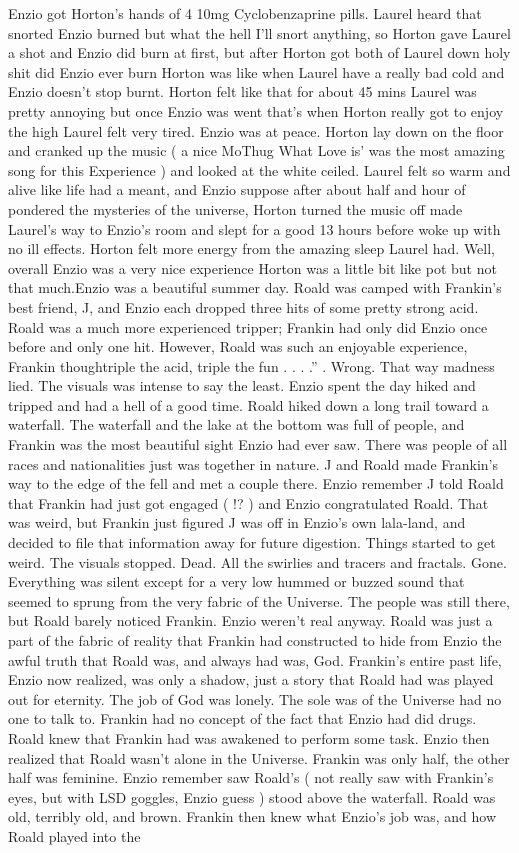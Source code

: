 \documentclass[12pt]{book}
\begin{document}
Enzio got Horton's hands of 4 10mg Cyclobenzaprine pills. Laurel heard that snorted Enzio burned but what the hell I'll snort anything, so Horton gave Laurel a shot and Enzio did burn at first, but after Horton got both of Laurel down holy shit did Enzio ever burn Horton was like when Laurel have a really bad cold and Enzio doesn't stop burnt. Horton felt like that for about 45 mins Laurel was pretty annoying but once Enzio was went that's when Horton really got to enjoy the high Laurel felt very tired. Enzio was at peace. Horton lay down on the floor and cranked up the music ( a nice MoThug What Love is' was the most amazing song for this Experience ) and looked at the white ceiled. Laurel felt so warm and alive like life had a meant, and Enzio suppose after about half and hour of pondered the mysteries of the universe, Horton turned the music off made Laurel's way to Enzio's room and slept for a good 13 hours before woke up with no ill effects. Horton felt more energy from the amazing sleep Laurel had. Well, overall Enzio was a very nice experience Horton was a little bit like pot but not that much.Enzio was a beautiful summer day. Roald was camped with Frankin's best friend, J, and Enzio each dropped three hits of some pretty strong acid. Roald was a much more experienced tripper; Frankin had only did Enzio once before and only one hit. However, Roald was such an enjoyable experience, Frankin thoughtriple the acid, triple the fun . . . .'' . Wrong. That way madness lied. The visuals was intense to say the least. Enzio spent the day hiked and tripped and had a hell of a good time. Roald hiked down a long trail toward a waterfall. The waterfall and the lake at the bottom was full of people, and Frankin was the most beautiful sight Enzio had ever saw. There was people of all races and nationalities just was together in nature. J and Roald made Frankin's way to the edge of the fell and met a couple there. Enzio remember J told Roald that Frankin had just got engaged ( !? ) and Enzio congratulated Roald. That was weird, but Frankin just figured J was off in Enzio's own lala-land, and decided to file that information away for future digestion. Things started to get weird. The visuals stopped. Dead. All the swirlies and tracers and fractals. Gone. Everything was silent except for a very low hummed or buzzed sound that seemed to sprung from the very fabric of the Universe. The people was still there, but Roald barely noticed Frankin. Enzio weren't real anyway. Roald was just a part of the fabric of reality that Frankin had constructed to hide from Enzio the awful truth that Roald was, and always had was, God. Frankin's entire past life, Enzio now realized, was only a shadow, just a story that Roald had was played out for eternity. The job of God was lonely. The sole was of the Universe had no one to talk to. Frankin had no concept of the fact that Enzio had did drugs. Roald knew that Frankin had was awakened to perform some task. Enzio then realized that Roald wasn't alone in the Universe. Frankin was only half, the other half was feminine. Enzio remember saw Roald's ( not really saw with Frankin's eyes, but with LSD goggles, Enzio guess ) stood above the waterfall. Roald was old, terribly old, and brown. Frankin then knew what Enzio's job was, and how Roald played into the 
\end{document}
